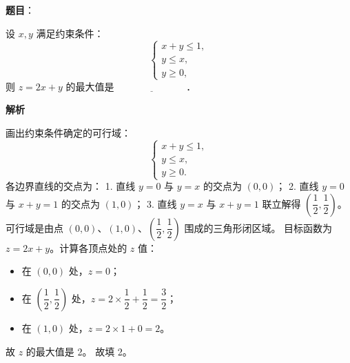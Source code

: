 \begin{answer}

\textbf{题目}：

设 $x,y$ 满足约束条件：
\nopagebreak[4]
\[
\begin{cases}
x+y\leqslant 1,\\
y\leqslant x,\\
y\geqslant 0,
\end{cases}
\]
则 $z=2x+y$ 的最大值是 $\underline{\hspace{3cm}}$．

\textbf{解析}

画出约束条件确定的可行域：
\nopagebreak[4]
\[
\begin{cases}
x+y\leqslant 1,\\
y\leqslant x,\\
y\geqslant 0.
\end{cases}
\]
各边界直线的交点为：
1. 直线 $y=0$ 与 $y=x$ 的交点为 $(0,0)$；
2. 直线 $y=0$ 与 $x+y=1$ 的交点为 $(1,0)$；
3. 直线 $y=x$ 与 $x+y=1$ 联立解得 $\left(\dfrac{1}{2},\dfrac{1}{2}\right)$。
可行域是由点 $(0,0)$、$(1,0)$、$\left(\dfrac{1}{2},\dfrac{1}{2}\right)$ 围成的三角形闭区域。
目标函数为 $z=2x+y$。计算各顶点处的 $z$ 值：
\begin{itemize}
\item 在 $(0,0)$ 处，$z=0$；
\item 在 $\left(\dfrac{1}{2},\dfrac{1}{2}\right)$ 处，$z=2\times\dfrac{1}{2}+\dfrac{1}{2}=\dfrac{3}{2}$；
\item 在 $(1,0)$ 处，$z=2\times 1+0=2$。
\end{itemize}
故 $z$ 的最大值是 2。
故填 2。


\end{answer}
